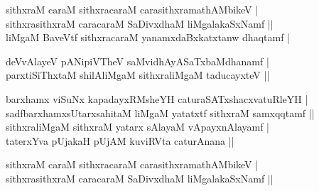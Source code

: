 \begin{entry}
\smallskip
\begin{shl}
sithxraM caraM sithxracaraM carasithxramathAMbikeV |\\
sithxrasithxraM caracaraM SaDivxdhaM liMgalakaSxNamf ||\\
liMgaM BaveVtf sithxracaraM yanamxdaBxkatxtanw dhaqtamf |
\end{shl}
\smallskip
{}
\smallskip
{}
\end{entry}

\begin{entry}
\smallskip
\begin{shl}
deVvAlayeV pANipiVTheV saMvidhAyASaTxbaMdhanamf |\\
parxtiSiThxtaM shilAliMgaM sithxraliMgaM taducayxteV ||
\end{shl}
\smallskip
{}
\smallskip
\begin{shl}
barxhamx viSuNx kapadayxRMsheYH caturaSATxshacxvatuRleYH |\\
sadfbarxhamxsUtarxsahitaM liMgaM yatatxtf sithxraM samxqqtamf ||\\
sithxraliMgaM sithxraM yatarx sAlayaM vApayxnAlayamf |\\
taterxYva pUjakaH pUjAM kuviRVta caturAnana ||
\end{shl}
\smallskip
{}
\smallskip
{}
\smallskip
{}
\end{entry}

\begin{entry}
\smallskip
\begin{shl}
sithxraM caraM sithxracaraM carasithxramathAMbikeV |\\
sithxrasithxraM caracaraM SaDivxdhaM liMgalakaSxNamf ||
\end{shl}
\smallskip
{}
\end{entry}

